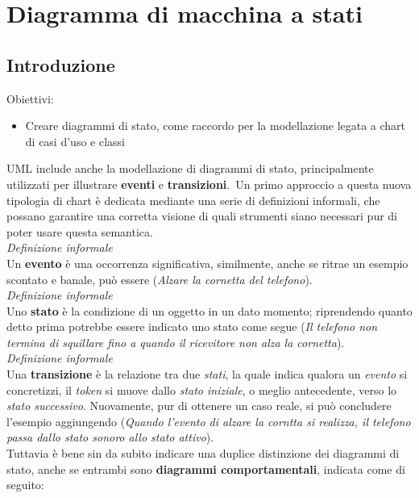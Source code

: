 \documentclass{article}
\begin{document}
\pagestyle{empty}
\section*{Diagramma di macchina a stati}
\large
\subsection*{Introduzione}
\large
Obiettivi:
\begin{itemize}[label={-}]
    \itemsep0em
    \item Creare diagrammi di stato, come raccordo per la modellazione legata a chart di casi d'uso e classi
\end{itemize}
UML include anche la modellazione di diagrammi di stato, principalmente utilizzati per illustrare \textbf{eventi} e \textbf{transizioni}.\ Un primo approccio a questa nuova tipologia di chart è dedicata mediante una serie di definizioni informali, che possano garantire una corretta visione di quali strumenti siano necessari pur di poter usare questa semantica.\vspace*{14pt}\\
\textit{Definizione informale}\\Un \textbf{evento} è una occorrenza significativa, similmente, anche se ritrae un esempio scontato e banale, può essere (\textit{Alzare la cornetta del telefono}).\vspace*{14pt}\\
\textit{Definizione informale}\\Uno \textbf{stato} è la condizione di un oggetto in un dato momento; riprendendo quanto detto prima potrebbe essere indicato uno stato come segue (\textit{Il telefono non termina di squillare fino a quando il ricevitore non alza la cornetta}).\vspace*{14pt}\\
\textit{Definizione informale}\\Una \textbf{transizione} è la relazione tra due \textit{stati}, la quale indica qualora un \textit{evento} si concretizzi, il \textit{token} si muove dallo \textit{stato iniziale}, o meglio antecedente, verso lo \textit{stato successivo}. Nuovamente, pur di ottenere un caso reale, si può concludere l'esempio aggiungendo (\textit{Quando l'evento di alzare la corntta si realizza, il telefono passa dallo stato sonoro allo stato attivo}).\vspace*{14pt}\\
Tuttavia è bene sin da subito indicare una duplice distinzione dei diagrammi di stato, anche se entrambi sono \textbf{diagrammi comportamentali}, indicata come di seguito:
\end{document}
